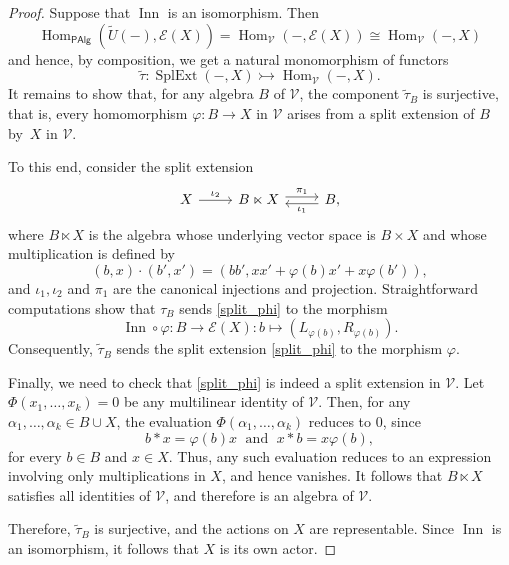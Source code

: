 \documentclass[10pt,a4paper]{amsart}
\newcommand{\E}{\mathcal{E}}
\DeclareMathOperator{\Hom}{Hom}
\DeclareMathOperator{\Inn}{Inn}
\newcommand{\PAlg}{\ensuremath{\mathsf{PAlg}}}
\DeclareMathOperator{\SplExt}{SplExt}
\newcommand{\V}{\mathcal{V}}
\begin{document}
\begin{proof}
Suppose that $\Inn$ is an isomorphism. Then
\[
\Hom_{\PAlg}(\widetilde{U}(-),\E(X))=\Hom_{\V}(-,\E(X)) \cong \Hom_{\V}(-,X)
\]
and hence, by composition, we get a natural monomorphism of functors
\[
\widetilde{\tau} \colon \SplExt(-,X) \rightarrowtail \Hom_{\V}(-,X).
\]
It remains to show that, for any algebra $B$ of $\V$, the component $\widetilde{\tau}_B$ is surjective, that is, every homomorphism $\varphi \colon B \to X$ in $\V$ arises from a split extension of $B$ by~$X$ in $\V$.

To this end, consider the split extension
\begin{equation}\label{split_phi}
\begin{tikzcd}
X \arrow[r, "\iota_2"] &
B \ltimes X \arrow[r, shift left, "\pi_1"] &
B, \arrow[l, shift left, "\iota_1"]
\end{tikzcd}
\end{equation}
where $B \ltimes X$ is the algebra whose underlying vector space is $B \times X$ and whose multiplication is defined by
\[
(b,x) \cdot (b',x') = (bb', xx' + \varphi(b)x' + x\varphi(b')),
\]
and $\iota_1, \iota_2$ and $\pi_1$ are the canonical injections and projection. Straightforward computations show that $\tau_B$ sends \eqref{split_phi} to the morphism
\[
\Inn \circ \varphi \colon B \to \E(X) \colon b \mapsto (L_{\varphi(b)}, R_{\varphi(b)}).
\]
Consequently, $\widetilde{\tau}_B$ sends the split extension \eqref{split_phi} to the morphism $\varphi$.

Finally, we need to check that \eqref{split_phi} is indeed a split extension in $\V$. Let $\Phi(x_1,\ldots,x_k)=0$ be any multilinear identity of $\V$. Then, for any $\alpha_1,\ldots,\alpha_k \in B \cup X$, the evaluation $\Phi(\alpha_1,\ldots,\alpha_k)$ reduces to $0$, since
\[
b \ast x = \varphi(b)x \; \text{ and } \; x \ast b = x\varphi(b),
\]
for every $b \in B$ and $x \in X$. Thus, any such evaluation reduces to an expression involving only multiplications in $X$, and hence vanishes. It follows that $B \ltimes X$ satisfies all identities of $\V$, and therefore is an algebra of $\V$.

Therefore, $\widetilde{\tau}_B$ is surjective, and the actions on $X$ are representable. Since $\Inn$ is an isomorphism, it follows that $X$ is its own actor.
\end{proof}
\end{document}
